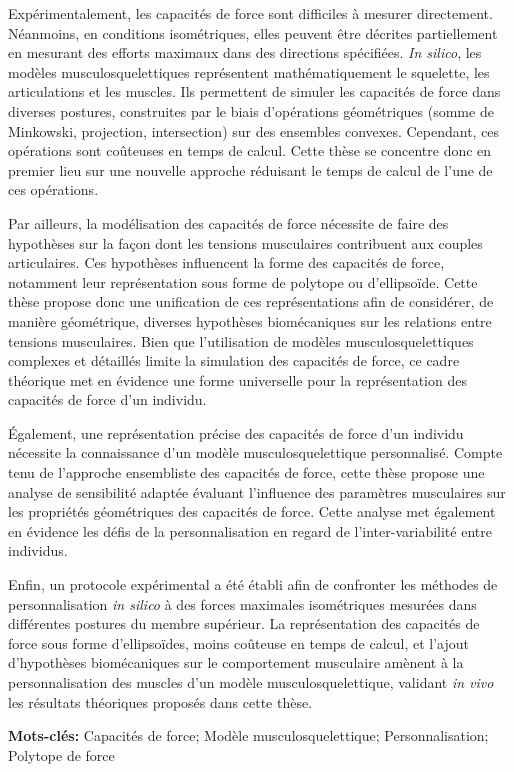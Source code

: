 Expérimentalement, les capacités de force sont difficiles à mesurer directement. Néanmoins, en conditions isométriques, elles peuvent être décrites partiellement en mesurant des efforts maximaux dans des directions spécifiées. \emph{In silico}, les modèles musculosquelettiques représentent mathématiquement le squelette, les articulations et les muscles. Ils permettent de simuler les capacités de force dans diverses postures, construites par le biais d'opérations géométriques (somme de Minkowski, projection, intersection) sur des ensembles convexes. Cependant, ces opérations sont coûteuses en temps de calcul. Cette thèse se concentre donc en premier lieu sur une nouvelle approche réduisant le temps de calcul de l'une de ces opérations.

Par ailleurs, la modélisation des capacités de force nécessite de faire des hypothèses sur la façon dont les tensions musculaires contribuent aux couples articulaires. Ces hypothèses influencent la forme des capacités de force, notamment leur représentation sous forme de polytope ou d'ellipsoïde. Cette thèse propose donc une unification de ces représentations afin de considérer, de manière géométrique, diverses hypothèses biomécaniques sur les relations entre tensions musculaires. Bien que l'utilisation de modèles musculosquelettiques complexes et détaillés limite la simulation des capacités de force, ce cadre théorique met en évidence une forme universelle pour la représentation des capacités de force d'un individu.

Également, une représentation précise des capacités de force d'un individu nécessite la connaissance d'un modèle musculosquelettique personnalisé. Compte tenu de l'approche ensembliste des capacités de force, cette thèse propose une analyse de sensibilité adaptée évaluant l'influence des paramètres musculaires sur les propriétés géométriques des capacités de force. Cette analyse met également en évidence les défis de la personnalisation en regard de l'inter-variabilité entre individus.

Enfin, un protocole expérimental a été établi afin de confronter les méthodes de personnalisation \emph{in silico} à des forces maximales isométriques mesurées dans différentes postures du membre supérieur. La représentation des capacités de force sous forme d'ellipsoïdes, moins coûteuse en temps de calcul, et l'ajout d'hypothèses biomécaniques sur le comportement musculaire amènent à la personnalisation des muscles d'un modèle musculosquelettique, validant \emph{in vivo} les résultats théoriques proposés dans cette thèse.

\textbf{Mots-clés:} Capacités de force; Modèle musculosquelettique; Personnalisation; Polytope de force